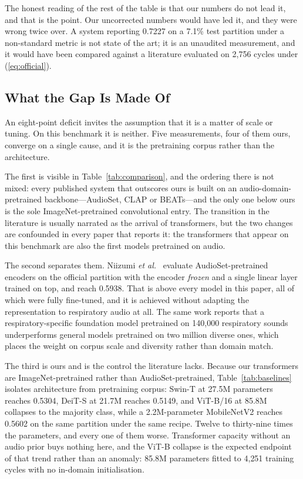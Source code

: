 \documentclass[journal,onecolumn]{IEEEtran}
\begin{document}
The honest reading of the rest of the table is that our numbers do not lead it, and that
is the point. Our uncorrected numbers would have led it, and they were wrong twice over. A
system reporting 0.7227 on a 7.1\% test partition under a non-standard metric is not state
of the art; it is an unaudited measurement, and it would have been compared against a
literature evaluated on 2{,}756 cycles under (\ref{eq:official}).

\subsection{What the Gap Is Made Of}
\label{subsec:pretraining}

An eight-point deficit invites the assumption that it is a matter of scale or
tuning. On this benchmark it is neither. Five measurements, four of them ours, converge
on a single cause, and it is the pretraining corpus rather than the architecture.

The first is visible in Table~\ref{tab:comparison}, and the ordering there is not mixed:
every published system that outscores ours is built on an audio-domain-pretrained
backbone---AudioSet, CLAP or BEATs---and the only one below ours is the sole
ImageNet-pretrained convolutional entry. The transition in the literature is usually narrated as the arrival of
transformers, but the two changes are confounded in every paper that reports it: the
transformers that appear on this benchmark are also the first models pretrained on
audio.

The second separates them. Niizumi \emph{et al.}~\cite{frozenfm2025} evaluate
AudioSet-pretrained encoders on the official partition with the encoder \emph{frozen} and
a single linear layer trained on top, and reach 0.5938. That is above every model in this
paper, all of which were fully fine-tuned, and it is achieved without adapting the
representation to respiratory audio at all. The same work reports that a
respiratory-specific foundation model pretrained on 140{,}000 respiratory sounds
underperforms general models pretrained on two million diverse ones, which places the
weight on corpus scale and diversity rather than domain match.

The third is ours and is the control the literature lacks. Because our transformers are
ImageNet-pretrained rather than AudioSet-pretrained, Table~\ref{tab:baselines} isolates
architecture from pretraining corpus: Swin-T at 27.5M parameters reaches 0.5304, DeiT-S at
21.7M reaches 0.5149, and ViT-B/16 at 85.8M collapses to the majority class, while a
2.2M-parameter MobileNetV2 reaches 0.5602 on the same partition under the same recipe.
Twelve to thirty-nine times the parameters, and every one of them worse. Transformer
capacity without an audio prior buys nothing here, and the ViT-B collapse is the expected
endpoint of that trend rather than an anomaly: 85.8M parameters fitted to 4{,}251 training
cycles with no in-domain initialisation.
\end{document}
